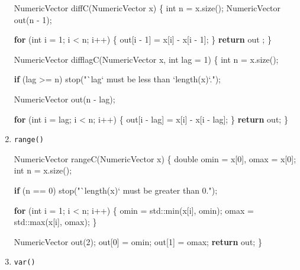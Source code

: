 \documentclass[
]{krantz}
\makeatletter
\newenvironment{Shaded}{\begin{snugshade}}{\end{snugshade}}
\newcommand{\BuiltInTok}[1]{#1}
\newcommand{\ControlFlowTok}[1]{\textcolor[rgb]{0.13,0.29,0.53}{\textbf{#1}}}
\newcommand{\DataTypeTok}[1]{\textcolor[rgb]{0.13,0.29,0.53}{#1}}
\newcommand{\DecValTok}[1]{\textcolor[rgb]{0.00,0.00,0.81}{#1}}
\newcommand{\NormalTok}[1]{#1}
\newcommand{\StringTok}[1]{\textcolor[rgb]{0.31,0.60,0.02}{#1}}
\newenvironment{kframe}{%
\medskip{}
\setlength{\fboxsep}{.8em}
 \def\at@end@of@kframe{}%
 \ifinner\ifhmode%
  \def\at@end@of@kframe{\end{minipage}}%
  \begin{minipage}{\columnwidth}%
 \fi\fi%
 \def\FrameCommand##1{\hskip\@totalleftmargin \hskip-\fboxsep
 \colorbox{shadecolor}{##1}\hskip-\fboxsep
     \hskip-\linewidth \hskip-\@totalleftmargin \hskip\columnwidth}%
 \MakeFramed {\advance\hsize-\width
   \@totalleftmargin\z@ \linewidth\hsize
   \@setminipage}}%
 {\par\unskip\endMakeFramed%
 \at@end@of@kframe}
\renewenvironment{Shaded}{\begin{kframe}}{\end{kframe}}
\renewcommand{\DataTypeTok}[1]{\textcolor[rgb]{0.56,0.13,0.00}{{#1}}}
\renewcommand{\DecValTok}  [1]{\textcolor[rgb]{0.25,0.63,0.44}{{#1}}}
\renewcommand{\StringTok}  [1]{\textcolor[rgb]{0.25,0.44,0.63}{{#1}}}
\renewcommand{\NormalTok}  [1]{{#1}}
\makeatother
\begin{document}
\begin{enumerate}
\begin{Shaded}
\begin{Highlighting}[]
\NormalTok{NumericVector diffC(NumericVector x) \{}
  \DataTypeTok{int}\NormalTok{ n = x.size();}
\NormalTok{  NumericVector out(n - }\DecValTok{1}\NormalTok{);}

  \ControlFlowTok{for}\NormalTok{ (}\DataTypeTok{int}\NormalTok{ i = }\DecValTok{1}\NormalTok{; i < n; i++) \{}
\NormalTok{    out[i - }\DecValTok{1}\NormalTok{] = x[i] - x[i - }\DecValTok{1}\NormalTok{];}
\NormalTok{  \}}
  \ControlFlowTok{return}\NormalTok{ out ;}
\NormalTok{\}}

\NormalTok{NumericVector difflagC(NumericVector x, }\DataTypeTok{int}\NormalTok{ lag = }\DecValTok{1}\NormalTok{) \{}
  \DataTypeTok{int}\NormalTok{ n = x.size();}

  \ControlFlowTok{if}\NormalTok{ (lag >= n) stop(}\StringTok{"`lag` must be less than `length(x)`."}\NormalTok{);}

\NormalTok{  NumericVector out(n - lag);}

  \ControlFlowTok{for}\NormalTok{ (}\DataTypeTok{int}\NormalTok{ i = lag; i < n; i++) \{}
\NormalTok{    out[i - lag] = x[i] - x[i - lag];}
\NormalTok{  \}}
  \ControlFlowTok{return}\NormalTok{ out;}
\NormalTok{\}}
\end{Highlighting}
\end{Shaded}
\item
  \texttt{range()}

\begin{Shaded}
\begin{Highlighting}[]
\NormalTok{NumericVector rangeC(NumericVector x) \{}
  \DataTypeTok{double}\NormalTok{ omin = x[}\DecValTok{0}\NormalTok{], omax = x[}\DecValTok{0}\NormalTok{];}
  \DataTypeTok{int}\NormalTok{ n = x.size();}

  \ControlFlowTok{if}\NormalTok{ (n == }\DecValTok{0}\NormalTok{) stop(}\StringTok{"`length(x)` must be greater than 0."}\NormalTok{);}

  \ControlFlowTok{for}\NormalTok{ (}\DataTypeTok{int}\NormalTok{ i = }\DecValTok{1}\NormalTok{; i < n; i++) \{}
\NormalTok{    omin = }\BuiltInTok{std::}\NormalTok{min(x[i], omin);}
\NormalTok{    omax = }\BuiltInTok{std::}\NormalTok{max(x[i], omax);}
\NormalTok{  \}}

\NormalTok{  NumericVector out(}\DecValTok{2}\NormalTok{);}
\NormalTok{  out[}\DecValTok{0}\NormalTok{] = omin;}
\NormalTok{  out[}\DecValTok{1}\NormalTok{] = omax;}
  \ControlFlowTok{return}\NormalTok{ out;}
\NormalTok{\}}
\end{Highlighting}
\end{Shaded}
\item
  \texttt{var()}


\end{enumerate}
\end{document}
